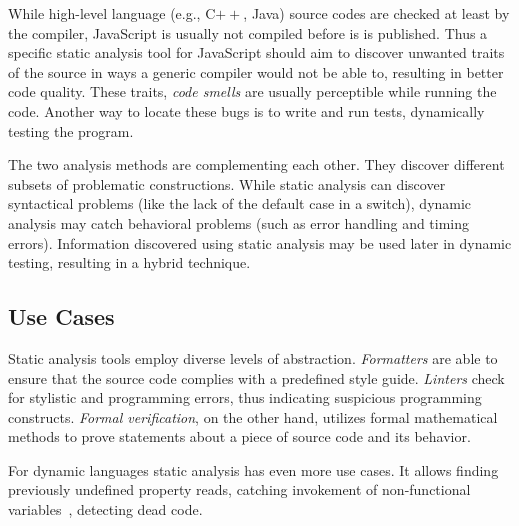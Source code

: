 
While high-level language (e.g., C$++$, Java) source codes are checked at least by the compiler, JavaScript is usually not compiled before is is published. Thus a specific static analysis tool for JavaScript should aim to discover unwanted traits of the source in ways a generic compiler would not be able to, resulting in better code quality. These traits, \emph{code smells} are usually perceptible while running the code. Another way to locate these bugs is to write and run tests, dynamically testing the program.

The two analysis methods are complementing each other. They discover different subsets of problematic constructions. While static analysis can discover syntactical problems (like the lack of the default case in a switch), dynamic analysis may catch behavioral problems (such as error handling and timing errors). Information discovered using static analysis may be used later in dynamic testing, resulting in a hybrid technique.



\subsection{Use Cases}
Static analysis tools employ diverse levels of abstraction. \emph{Formatters} are able to ensure that the source code complies with a predefined style guide. \emph{Linters} check for stylistic and programming errors, thus indicating suspicious programming constructs. \emph{Formal verification}, on the other hand, utilizes formal mathematical methods to prove statements about a piece of source code and its behavior.

For dynamic languages static analysis has even more use cases. It allows finding previously undefined property reads, catching invokement of non-functional variables~\cite{jensen_type_2009}, detecting dead code.


